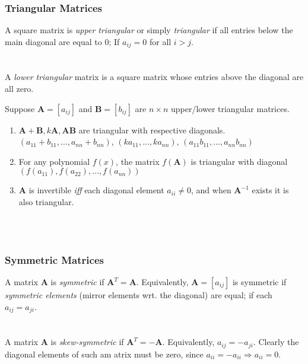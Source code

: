 \documentclass[../setup.tex]{subfiles}
\begin{document}
\subsubsection{Triangular Matrices}
A square matrix is \textit{upper triangular} or simply \textit{triangular} if all entries below the main diagonal are equal to $0$; If $a_{ij} = 0$ for all $i > j$. \\
\phantom \\ \\
A \textit{lower triangular} matrix is a square matrix whose entries above the diagonal are all zero. \\
\begin{theorem}
Suppose $\bm{A} = [a_{ij}]$ and $\bm{B} = [b_{ij}]$ are $n \times n$ upper/lower triangular matrices.
\begin{enumerate}
	\item $\bm{A} + \bm{B}, k\bm{A}, \bm{AB}$ are triangular with respective diagonals. \\ $(a_{11} + b_{11}, \dots, a_{nn} + b_{nn})$, $(ka_{11}, \dots, ka_{nn})$, $(a_{11}b_{11}, \dots, a_{nn}b_{nn})$ \\
	\item For any polynomial $f(x)$, the matrix $f(\bm{A})$ is triangular with diagonal $\left(f(a_{11}), f(a_{22}), \dots, f(a_{nn})\right)$ \\
	\item $\bm{A}$ is invertible \textit{iff} each diagonal element $a_{ii} \neq 0$, and when $\bm{A}^{-1}$ exists it is also triangular. \\
\end{enumerate}
\end{theorem}
\phantom \\ \\


\subsubsection{Symmetric Matrices}
A matrix $\bm{A}$ is \textit{symmetric} if $\bm{A}^T = \bm{A}$. Equivalently, $\bm{A} = [a_{ij}]$ is symmetric if \textit{symmetric elements} (mirror elements wrt. the diagonal) are equal; if each $a_{ij} = a_{ji}$. \\
\phantom \\ \\
A matrix $\bm{A}$ is \textit{skew-symmetric} if $\bm{A}^T = -\bm{A}$. Equivalently, $a_{ij} = -a_{ji}$. Clearly the diagonal elements of such am atrix must be zero, since $a_{ii} = -a_{ii} \Rightarrow a_{ii} = 0$. \\
\phantom \\ \\
\end{document}

